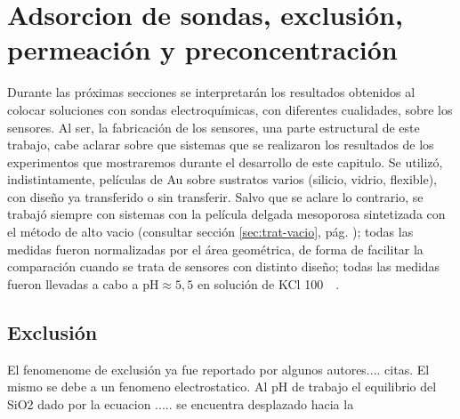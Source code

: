 



	
 
				
	

\section{Adsorcion de sondas, exclusión, permeación y preconcentración}

	Durante las próximas secciones se interpretarán los resultados obtenidos al colocar soluciones con sondas electroquímicas, con diferentes cualidades, sobre los sensores. Al ser,  la fabricación de los sensores, una parte estructural de este trabajo, cabe aclarar sobre que sistemas que se realizaron los resultados de los experimentos que mostraremos durante el desarrollo de este capitulo. Se utilizó, indistintamente, películas de Au sobre sustratos varios (silicio, vidrio, flexible), con diseño ya transferido o sin transferir. Salvo que se aclare lo contrario, se trabajó siempre con sistemas con la película delgada mesoporosa sintetizada con el método de alto vacio (consultar sección \ref{sec:trat-vacio}, pág. \pageref{sec:trat-vacio}); todas las medidas fueron normalizadas por el área geométrica, de forma de facilitar la comparación cuando se trata de sensores con distinto diseño; todas las medidas fueron llevadas a cabo a pH$\approx 5,5$ en solución de KCl \SI{100}{\milli\Molar}.

	\subsection{Exclusión}

	El fenomenome de exclusión ya fue reportado por algunos autores.... citas. El mismo se debe a un fenomeno electrostatico. Al pH de trabajo el equilibrio del SiO2 dado por la ecuacion ..... se encuentra desplazado hacia la

